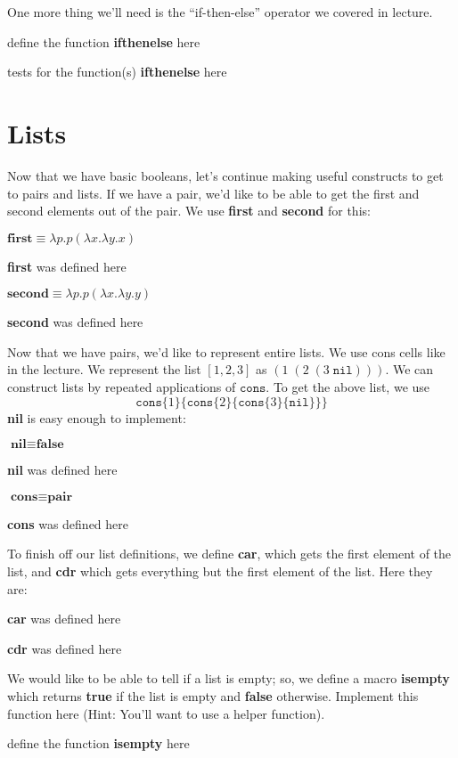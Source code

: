 \documentclass{article}
\newcommand{\op}[1]{\textbf{#1}}
\newcommand{\lcalc}[1]{\begin{center}\ensuremath{#1}\end{center}}
\newcommand{\error}[1]{Something went wrong.}
\newcommand{\begintodo}[1]{\begin{center}define the function \op{#1} here\end{center}}
\newcommand{\begindone}[1]{\begin{center}\op{#1} was defined here\end{center}}
\newcommand{\finishtodo}[1]{}
\newcommand{\finishdone}[1]{}
\newcommand{\test}[2]{#1 = #2\par}
\newcommand{\begintests}[1]{\begin{center}tests for the function(s) \op{#1} here\\}
\newcommand{\finishtests}[1]{\end{center}}
\renewcommand{\c}[2]{\texttt{cons}\{#1\}\{#2\}}
\begin{document}
One more thing we'll need is the ``if-then-else'' operator we covered in lecture.
\begintodo{ifthenelse}
\newcommand{\ifthenelse}[3]{}
\finishtodo{ifthenelse}

\begintests{ifthenelse}
\finishtests{ifthenelse}

\section{Lists}
Now that we have basic booleans, let's continue making useful constructs to get to
pairs and lists.  If we have a pair, we'd like to be able to get the first and
second elements out of the pair.  We use \op{first} and \op{second} for this:

\lcalc{\op{first} \equiv \lambda p . p (\lambda x. \lambda y. x)}
\begindone{first}
\newcommand{\first}[1]{#1{\true}}
\finishdone{first}

\lcalc{\op{second} \equiv \lambda p . p (\lambda x. \lambda y. y)}
\begindone{second}
\newcommand{\second}[1]{#1{\false}}
\finishdone{second}

Now that we have pairs, we'd like to represent entire lists.  We use
cons cells like in the lecture. We represent the list $[1, 2, 3]$ as
$(1\;(2\;(3\;\texttt{nil})))$. We can construct lists by repeated 
applications of $\texttt{cons}$. To get the above list, we use
$$\c{1}{\c{2}{\c{3}{\texttt{nil}}}}$$
\op{nil} is easy enough to implement:

\lcalc{\op{nil} \equiv \op{false}}
\begindone{nil}
\newcommand{\nil}{\false}
\finishdone{nil}

\lcalc{\op{cons} \equiv \op{pair}}
\begindone{cons}
\newcommand{\cons}{\pair}
\finishdone{cons}

To finish off our list definitions, we define \op{car}, which gets the first
element of the list, and \op{cdr} which gets everything but the first element
of the list.  Here they are:

\begindone{car}
\newcommand{\car}{\first}
\finishdone{car}
\begindone{cdr}
\newcommand{\cdr}{\second}
\finishdone{cdr}

We would like to be able to tell if a list is empty; so, we define a macro \op{isempty}
which returns \op{true} if the list is empty and \op{false} otherwise.  Implement this
function here (Hint: You'll want to use a helper function).

\begintodo{isempty}
\newcommand{\isempty}[1]{}
\finishtodo{isempty}
\end{document}
